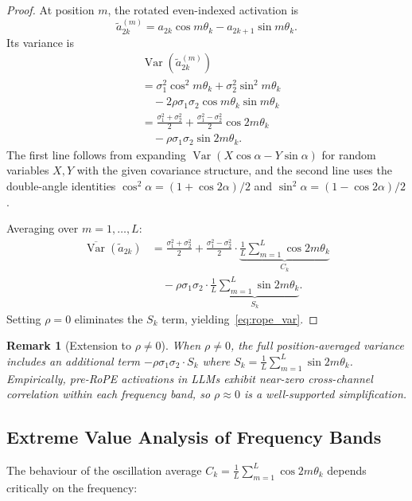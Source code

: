 \documentclass[11pt,a4paper]{article}
\newtheorem{remark}{Remark}
\DeclareMathOperator{\Var}{Var}
\begin{document}
\begin{proof}
At position $m$, the rotated even-indexed activation is
\[
\tilde{a}_{2k}^{(m)} = a_{2k} \cos m\theta_k - a_{2k+1} \sin m\theta_k.
\]
Its variance is
\begin{align}
&\Var(\tilde{a}_{2k}^{(m)}) \nonumber\\
&= \sigma_1^2 \cos^2 m\theta_k + \sigma_2^2 \sin^2 m\theta_k \nonumber\\
&\quad - 2\rho\sigma_1\sigma_2 \cos m\theta_k \sin m\theta_k \nonumber\\
&= \frac{\sigma_1^2 + \sigma_2^2}{2}
  + \frac{\sigma_1^2 - \sigma_2^2}{2}\cos 2m\theta_k \nonumber\\
&\quad - \rho\sigma_1\sigma_2 \sin 2m\theta_k.
\label{eq:var_single_pos}
\end{align}
The first line follows from expanding $\Var(X\cos\alpha - Y\sin\alpha)$ for random variables $X, Y$ with the given covariance structure, and the second line uses the double-angle identities $\cos^2\alpha = (1 + \cos 2\alpha)/2$ and $\sin^2\alpha = (1 - \cos 2\alpha)/2$.

Averaging over $m = 1, \ldots, L$:
\begin{align}
\overline{\Var}(\tilde{a}_{2k})
&= \frac{\sigma_1^2 + \sigma_2^2}{2}
+ \frac{\sigma_1^2 - \sigma_2^2}{2} \cdot
\underbrace{\frac{1}{L}\sum_{m=1}^{L}\cos 2m\theta_k}_{C_k} \nonumber\\
&\quad - \rho\sigma_1\sigma_2 \cdot
\underbrace{\frac{1}{L}\sum_{m=1}^{L}\sin 2m\theta_k}_{S_k}.
\end{align}
Setting $\rho = 0$ eliminates the $S_k$ term, yielding~\eqref{eq:rope_var}.
\end{proof}

\begin{remark}[Extension to $\rho \neq 0$]
\label{rem:general_rho}
When $\rho \neq 0$, the full position-averaged variance includes an additional term $-\rho\sigma_1\sigma_2 \cdot S_k$ where $S_k = \frac{1}{L}\sum_{m=1}^{L}\sin 2m\theta_k$.
Empirically, pre-RoPE activations in LLMs exhibit near-zero cross-channel correlation within each frequency band, so $\rho \approx 0$ is a well-supported simplification.
\end{remark}

\subsection{Extreme Value Analysis of Frequency Bands}

The behaviour of the oscillation average $C_k = \frac{1}{L}\sum_{m=1}^{L}\cos 2m\theta_k$ depends critically on the frequency:
\end{document}
